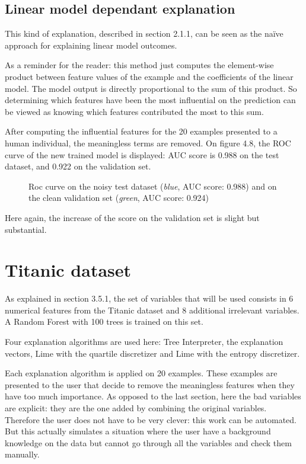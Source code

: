 \documentclass[a4paper,11pt]{kth-mag}
\begin{document}
\subsection{Linear model dependant explanation}

This kind of explanation, described in section 2.1.1, can be seen as the naïve approach for explaining linear model outcomes. 

As a reminder for the reader: this method just computes the element-wise product between feature values of the example and the coefficients of the linear model. The model output is directly proportional to the sum of this product. So determining which features have been the most influential on the prediction can be viewed as knowing which features contributed the most to this sum.

After computing the influential features for the 20 examples presented to a human individual, the meaningless terms are removed. On figure 4.8, the ROC curve of the new trained model is displayed: AUC score is 0.988 on the test dataset, and 0.922 on the validation set.

\begin{figure}[h!]
		\centering
    	\def\svgwidth{\columnwidth}
    	\resizebox{0.6\textwidth}{!}{}
    	\caption{Roc curve on the noisy test dataset (\textit{blue}, AUC score: 0.988) and on the clean validation set (\textit{green}, AUC score: 0.924)}
\end{figure}

Here again, the increase of the score on the validation set is slight but substantial.

\section{Titanic dataset}

As explained in section 3.5.1, the set of variables that will be used consists in 6 numerical features from the Titanic dataset and 8 additional irrelevant variables. A Random Forest with 100 trees is trained on this set.

Four explanation algorithms are used here: Tree Interpreter, the explanation vectors, Lime with the quartile discretizer and Lime with the entropy discretizer.

Each explanation algorithm is applied on 20 examples. These examples are presented to the user that decide to remove the meaningless features when they have too much importance. As opposed to the last section, here the bad variables are explicit: they are the one added by combining the original variables. Therefore the user does not have to be very clever: this work can be automated. But this actually simulates a situation where the user have a background knowledge on the data but cannot go through all the variables and check them manually.
\end{document}
